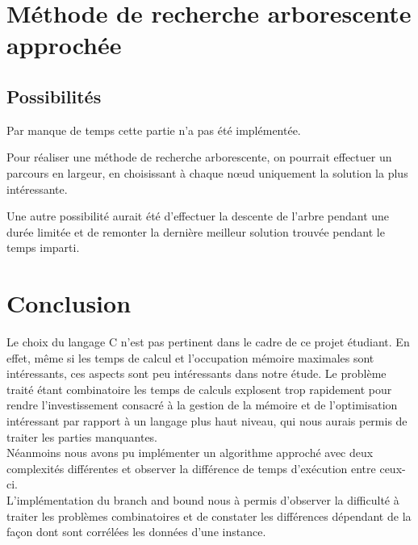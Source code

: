 \documentclass[12pt]{article}
\begin{document}
\clearpage
\newpage
\section{Méthode de recherche arborescente approchée}

\subsection{Possibilités}

Par manque de temps cette partie n'a pas été implémentée.

Pour réaliser une méthode de recherche arborescente, on pourrait effectuer un parcours en largeur, en choisissant à chaque nœud uniquement la solution la plus intéressante.

Une autre possibilité aurait été d'effectuer la descente de l'arbre pendant une durée limitée et de remonter la dernière meilleur solution trouvée pendant le temps imparti.

\clearpage
\newpage
\section{Conclusion}

Le choix du langage C n'est pas pertinent dans le cadre de ce projet étudiant. En effet, même si les temps de calcul et l'occupation mémoire maximales sont intéressants, ces aspects sont peu intéressants dans notre étude. Le problème traité étant combinatoire les temps de calculs explosent trop rapidement pour rendre l'investissement consacré à la gestion de la mémoire et de l'optimisation intéressant par rapport à un langage plus haut niveau, qui nous aurais permis de traiter les parties manquantes.\\

Néanmoins nous avons pu implémenter un algorithme approché avec deux complexités différentes et observer la différence de temps d'exécution entre ceux-ci.\\

L'implémentation du branch and bound nous à permis d'observer la difficulté à traiter les problèmes combinatoires et de constater les différences dépendant de la façon dont sont corrélées les données d'une instance.\\



\end{document}
